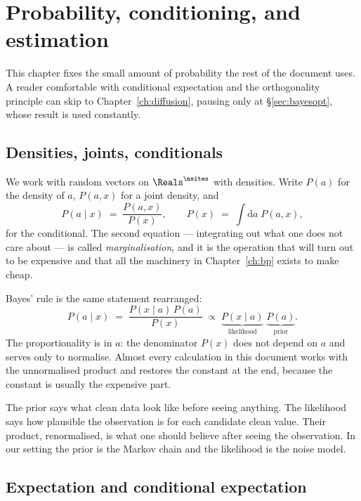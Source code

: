 \chapter{Probability, conditioning, and estimation}
\label{ch:probability}

This chapter fixes the small amount of probability the rest of the document uses. A reader
comfortable with conditional expectation and the orthogonality principle can skip to
Chapter~\ref{ch:diffusion}, pausing only at \S\ref{sec:bayesopt}, whose result is used
constantly.

\section{Densities, joints, conditionals}

We work with random vectors on $\Reals^{\nsites}$ with densities. Write $P(a)$ for the density
of $a$, $P(a,x)$ for a joint density, and
\begin{equation}
P(a\mid x) \;=\; \frac{P(a,x)}{P(x)},
\qquad
P(x) \;=\; \int \mathrm{d}a\; P(a,x),
\end{equation}
for the conditional. The second equation --- integrating out what one does not care about ---
is called \emph{marginalisation}, and it is the operation that will turn out to be expensive
and that all the machinery in Chapter~\ref{ch:bp} exists to make cheap.

Bayes' rule is the same statement rearranged:
\begin{equation}
\label{eq:bayes}
P(a \mid x) \;=\; \frac{P(x\mid a)\,P(a)}{P(x)} \;\propto\; \underbrace{P(x\mid a)}_{\text{likelihood}}\;\underbrace{P(a)}_{\text{prior}} .
\end{equation}
The proportionality is in $a$: the denominator $P(x)$ does not depend on $a$ and serves only
to normalise. Almost every calculation in this document works with the unnormalised product
and restores the constant at the end, because the constant is usually the expensive part.

\begin{intuition}
The prior says what clean data look like before seeing anything. The likelihood says how
plausible the observation is for each candidate clean value. Their product, renormalised, is
what one should believe after seeing the observation. In our setting the prior is the Markov
chain and the likelihood is the noise model.
\end{intuition}

\section{Expectation and conditional expectation}

